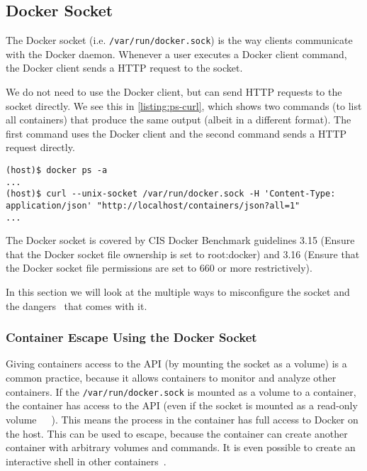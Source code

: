 \subsection{Docker Socket}\label{subsection:api}
The Docker socket (i.e. \lstinline{/var/run/docker.sock}) is the way clients communicate with the Docker daemon. Whenever a user executes a Docker client command, the Docker client sends a HTTP request to the socket.

We do not need to use the Docker client, but can send HTTP requests to the socket directly. We see this in \autoref{listing:ps-curl}, which shows two commands (to list all containers) that produce the same output (albeit in a different format). The first command uses the Docker client and the second command sends a HTTP request directly.
\begin{lstlisting}[caption={Interaction with the Docker daemon with the Docker client and the socket directly.},captionpos=b, label={listing:ps-curl}]
(host)$ docker ps -a
...
(host)$ curl --unix-socket /var/run/docker.sock -H 'Content-Type: application/json' "http://localhost/containers/json?all=1"
...
\end{lstlisting}

\medskip

The Docker socket is covered by CIS Docker Benchmark guidelines 3.15 (Ensure that the Docker socket file ownership is set to root:docker) and 3.16 (Ensure that the Docker socket file permissions are set to 660 or more restrictively).

\medskip

In this section we will look at the multiple ways to misconfigure the socket and the dangers~\cite{The-Dangers-Of-Docker-Sock} that comes with it.

\subsubsection{Container Escape Using the Docker Socket}
Giving containers access to the API (by mounting the socket as a volume) is a common practice, because it allows containers to monitor and analyze other containers. If the \lstinline{/var/run/docker.sock} is mounted as a volume to a container, the container has access to the API (even if the socket is mounted as a read-only volume~\cite{The-Dangers-Of-Docker-Sock}~\cite{Read-Only-Docker-Socket-Tweet}~\cite{Read-Only-Docker-Socket-Hackernews}). This means the process in the container has full access to Docker on the host. This can be used to escape, because the container can create another container with arbitrary volumes and commands. It is even possible to create an interactive shell in other containers~\cite{Escape-Socket-Shell}.

